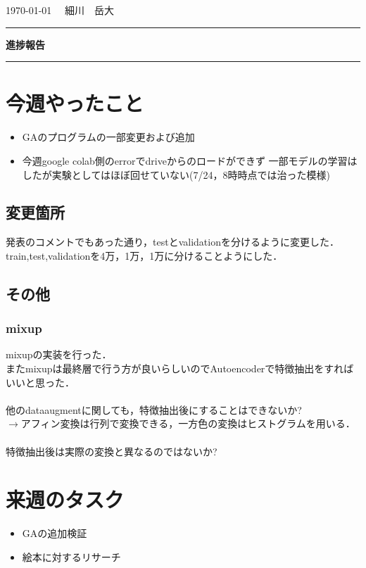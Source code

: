 \documentclass[]{jarticle}     %
\begin{document}
\noindent

\hspace{1em}
\today
\hfill
\ \ 細川　岳大

\vspace{2mm}

\hrule

\begin{center}
{\Large \bf 進捗報告}
\end{center}
\hrule
\vspace{3mm}



\section{今週やったこと}
\begin{itemize}
 \item GAのプログラムの一部変更および追加
 \item 今週google colab側のerrorでdriveからのロードができず
 一部モデルの学習はしたが実験としてはほぼ回せていない(7/24，8時時点では治った模様)
\end{itemize}
\subsection{変更箇所}
発表のコメントでもあった通り，testとvalidationを分けるように変更した．
train,test,validationを4万，1万，1万に分けることようにした．

\subsection{その他}
\subsubsection{mixup}
mixupの実装を行った．\\
またmixupは最終層で行う方が良いらしいのでAutoencoderで特徴抽出をすればいいと思った．\\
\\
他のdataaugmentに関しても，特徴抽出後にすることはできないか?\\
$\rightarrow$アフィン変換は行列で変換できる，一方色の変換はヒストグラムを用いる．\\
\\
特徴抽出後は実際の変換と異なるのではないか?

\section{来週のタスク}
\begin{itemize}
	\item GAの追加検証
	\item 絵本に対するリサーチ
\end{itemize}
\end{document}
